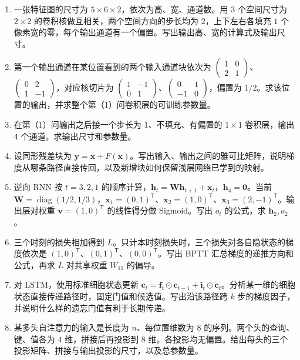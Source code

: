 \begin{enumerate}[label=(\arabic*)]
\item 一张特征图的尺寸为 $5\times6\times2$，依次为高、宽、通道数。用 $3$ 个空间尺寸为 $2\times2$ 的卷积核做互相关，两个空间方向的步长均为 $2$，上下左右各填充 $1$ 个像素宽的零，每个输出通道有一个偏置。写出输出高、宽的计算式及输出尺寸。
\item 第一个输出通道在某位置看到的两个输入通道块依次为 $\begin{pmatrix}1&0\\2&1\end{pmatrix}$、$\begin{pmatrix}0&2\\1&-1\end{pmatrix}$，对应核切片为 $\begin{pmatrix}1&-1\\0&1\end{pmatrix}$、$\begin{pmatrix}0&1\\-1&0\end{pmatrix}$，偏置为 $1/2$。求该位置的输出，并求整个第（1）问卷积层的可训练参数量。
\item 在第（1）问输出之后接一个步长为 $1$、不填充、有偏置的 $1\times1$ 卷积层，输出 $4$ 个通道。求输出尺寸和参数量。
\item 设同形残差块为 $\bm{y}=\bm{x}+F(\bm{x})$。写出输入、输出之间的雅可比矩阵，说明梯度从哪条路径直接传回，以及新增块如何保留浅层网络已学到的映射。
\item 逆向 RNN 按 $t=3,2,1$ 的顺序计算，$\bm{h}_t=\bm{W}\bm{h}_{t+1}+\bm{x}_t$，$\bm{h}_4=\bm{0}$。当前 $\bm{W}=\operatorname{diag}(1/2,1/3)$，$\bm{x}_1=(0,1)^{\mathsf T}$、$\bm{x}_2=(1,0)^{\mathsf T}$、$\bm{x}_3=(2,-1)^{\mathsf T}$。输出层对权重 $\bm{v}=(1,0)^{\mathsf T}$ 的线性得分做 Sigmoid。写出 $o_t$ 的公式，求 $\bm{h}_2,o_2$。
\item 三个时刻的损失相加得到 $L$。只计本时刻损失时，三个损失对各自隐状态的梯度依次是 $(1,0)^{\mathsf T}$、$(0,1)^{\mathsf T}$、$(0,0)^{\mathsf T}$。写出 BPTT 汇总梯度的递推方向和公式，再求 $L$ 对共享权重 $W_{11}$ 的偏导。
\item 对 LSTM，使用标准细胞状态更新 $\bm{c}_t=\bm{f}_t\odot\bm{c}_{t-1}+\bm{i}_t\odot\widetilde{\bm{c}}_t$。分析某一维的细胞状态直接传递路径时，固定门值和候选值。写出沿该路径跨 $k$ 步的梯度因子，并说明什么样的遗忘门值有利于长期传递。
\item 某多头自注意力的输入是长度为 $n$、每位置维数为 $8$ 的序列。两个头的查询、键、值各为 $4$ 维，拼接后再投影到 $8$ 维。各投影均无偏置。给出每头的三个投影矩阵、拼接与输出投影的尺寸，以及总参数量。

\end{enumerate}
